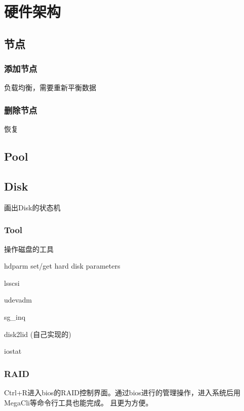 \chapter{硬件架构}

\section{节点}

\subsection{添加节点}

负载均衡，需要重新平衡数据

\subsection{删除节点}

恢复


\section{Pool}

\section{Disk}

画出Disk的状态机

\subsection{Tool}

操作磁盘的工具
\begin{enumbox}
\item hdparm set/get hard disk parameters
\item lsscsi
\item udevadm
\item sg\_inq
\item disk2lid (自己实现的)
\item iostat
\end{enumbox}

\subsection{RAID}

Ctrl+R进入bios的RAID控制界面。通过bios进行的管理操作，进入系统后用MegaCli等命令行工具也能完成。
且更为方便。

